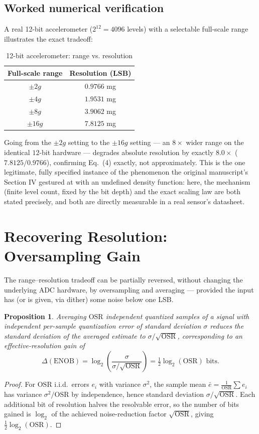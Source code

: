 \documentclass[10pt,journal,compsoc]{IEEEtran}
\newtheorem{proposition}{Proposition}
\begin{document}
\subsection{Worked numerical verification}
A real 12-bit accelerometer ($2^{12}=4096$ levels) with a selectable full-scale range illustrates the exact tradeoff:

\begin{table}[h]
\centering
\caption{12-bit accelerometer: range vs. resolution}
\begin{tabular}{cc}
\toprule
\textbf{Full-scale range} & \textbf{Resolution (LSB)} \\
\midrule
$\pm 2g$  & $0.9766$ mg \\
$\pm 4g$  & $1.9531$ mg \\
$\pm 8g$  & $3.9062$ mg \\
$\pm 16g$ & $7.8125$ mg \\
\bottomrule
\end{tabular}
\end{table}

Going from the $\pm2g$ setting to the $\pm16g$ setting — an $8\times$ wider range on the identical $12$-bit hardware — degrades absolute resolution by exactly $8.0\times$ ($7.8125/0.9766$), confirming Eq.~(4) exactly, not approximately. This is the one legitimate, fully specified instance of the phenomenon the original manuscript's Section IV gestured at with an undefined density function: here, the mechanism (finite level count, fixed by the bit depth) and the exact scaling law are both stated precisely, and both are directly measurable in a real sensor's datasheet.

\section{Recovering Resolution: Oversampling Gain}
The range--resolution tradeoff can be partially reversed, without changing the underlying ADC hardware, by oversampling and averaging — provided the input has (or is given, via dither) some noise below one LSB.

\begin{proposition}
Averaging $\mathrm{OSR}$ independent quantized samples of a signal with independent per-sample quantization error of standard deviation $\sigma$ reduces the standard deviation of the averaged estimate to $\sigma/\sqrt{\mathrm{OSR}}$, corresponding to an effective-resolution gain of
\begin{equation}
    \Delta(\mathrm{ENOB}) = \log_2\!\left(\frac{\sigma}{\sigma/\sqrt{\mathrm{OSR}}}\right) = \tfrac12\log_2(\mathrm{OSR}) \text{ bits}.
\end{equation}
\end{proposition}
\begin{proof}
For $\mathrm{OSR}$ i.i.d.\ errors $e_i$ with variance $\sigma^2$, the sample mean $\bar e = \frac1{\mathrm{OSR}}\sum e_i$ has variance $\sigma^2/\mathrm{OSR}$ by independence, hence standard deviation $\sigma/\sqrt{\mathrm{OSR}}$. Each additional bit of resolution halves the resolvable error, so the number of bits gained is $\log_2$ of the achieved noise-reduction factor $\sqrt{\mathrm{OSR}}$, giving $\tfrac12\log_2(\mathrm{OSR})$.
\end{proof}
\end{document}
